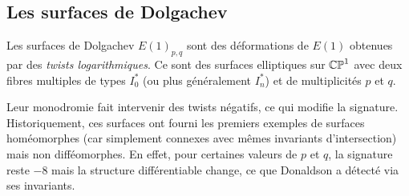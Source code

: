 \subsection{Les surfaces de Dolgachev}

Les surfaces de Dolgachev $E(1)_{p,q}$ sont des déformations de $E(1)$ obtenues par des \emph{twists logarithmiques}. Ce sont des surfaces elliptiques sur $\mathbb{CP}^1$ avec deux fibres multiples de types $I_0^*$ (ou plus généralement $I_n^*$) et de multiplicités $p$ et $q$.

Leur monodromie fait intervenir des twists négatifs, ce qui modifie la signature. Historiquement, ces surfaces ont fourni les premiers exemples de surfaces homéomorphes (car simplement connexes avec mêmes invariants d'intersection) mais non difféomorphes. En effet, pour certaines valeurs de $p$ et $q$, la signature reste $-8$ mais la structure différentiable change, ce que Donaldson a détecté via ses invariants.
